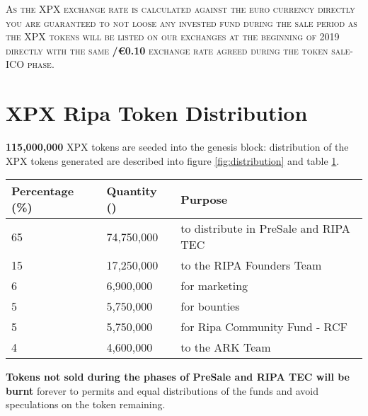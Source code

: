 \documentclass[11pt,fleqn,oneside]{book} %
\begin{document}
\textsc{As the XPX exchange rate is calculated against the euro currency directly you are guaranteed to not loose any invested fund
during the sale period as the XPX tokens will be listed on our exchanges at the beginning of 2019 directly with the same \textbf{\PHP/\euro0.10}
exchange rate agreed during the token sale-ICO phase}.

\section{XPX Ripa Token Distribution}
\textbf{115,000,000} XPX tokens are seeded into the genesis block: distribution of the XPX tokens generated are described into
figure \ref{fig:distribution} and table \ref{tab:distribution}.

\vspace{5mm}
	\label{fig:distribution}

\vspace{5mm}
\begin{table}[H]
	\centering
	\begin{tabular}{l l l}
		\toprule
		\textbf{Percentage (\%)} & \textbf{Quantity (\PHP)} & \textbf{Purpose} \\
		\midrule
		65		& 74,750,000	& to distribute in PreSale and RIPA TEC	\\
		15      & 17,250,000	& to the RIPA Founders Team	\\
		6       & 6,900,000		& for marketing	\\
		5       & 5,750,000 	& for bounties	\\
		5       & 5,750,000		& for Ripa Community Fund - RCF	\\
		4       & 4,600,000		& to the ARK Team	\\
		\bottomrule
	\end{tabular}
	\label{tab:distribution}
\end{table}

\vspace{5mm}
\textbf{Tokens not sold during the phases of PreSale and RIPA TEC will be burnt} forever to permits and equal distributions 
of the funds and avoid speculations on the token remaining.
\end{document}
